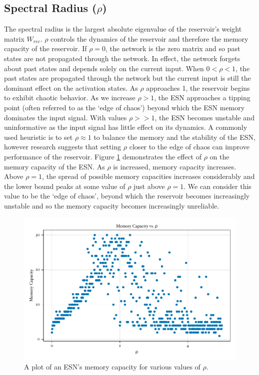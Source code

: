 \documentclass[a4paper,12pt]{article}
\begin{document}
\subsection*{Spectral Radius ($\rho$)}
The spectral radius is the largest absolute eigenvalue of the reservoir's weight matrix $W_{rec}$. $\rho$ controls the dynamics of the reservoir and therefore the memory capacity of the reservoir.
If $\rho = 0$, the network is the zero matrix and so past states are not propagated through the network. In effect, the network forgets about past states and depends solely on the current input.
When $0 < \rho < 1$, the past states are propagated through the network but the current input is still the dominant effect on the activation states. As $\rho$ approaches 1, the reservoir begins to exhibit chaotic behavior. As we increase $\rho > 1$, the ESN approaches a tipping point (often referred to as the `edge of chaos') beyond which the ESN memory dominates the input signal. With values $\rho >> 1$, the ESN becomes unstable and uninformative as the input signal has little effect on its dynamics. A commonly used heuristic is to set $\rho \approx 1$ to balance the memory and the stability of the ESN, however research suggests that setting $\rho$ closer to the edge of chaos can improve performance of the reservoir.
Figure \ref{fig:memory_capacity_vs_rho} demonstrates the effect of $\rho$ on the memory capacity of the ESN. As $\rho$ is increased, memory capacity increases. Above $\rho = 1$, the spread of possible memory capacities increases considerably and the lower bound peaks at some value of $\rho$ just above $\rho=1$. We can consider this value to be the `edge of chaos', beyond which the reservoir becomes increasingly unstable and so the memory capacity becomes increasingly unreliable.


\begin{figure}[t]
\centering
\includegraphics{memory_capacity_vs_rho}
\caption{A plot of an ESN's memory capacity for various values of $\rho$.}
\label{fig:memory_capacity_vs_rho}
\end{figure}
\end{document}
